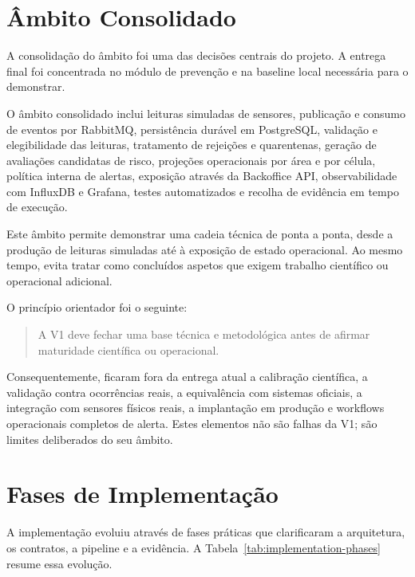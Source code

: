 \section{Âmbito Consolidado}

A consolidação do âmbito foi uma das decisões centrais do projeto. A entrega final foi concentrada no módulo de prevenção e na baseline local necessária para o demonstrar.

O âmbito consolidado inclui leituras simuladas de sensores, publicação e consumo de eventos por RabbitMQ, persistência durável em PostgreSQL, validação e elegibilidade das leituras, tratamento de rejeições e quarentenas, geração de avaliações candidatas de risco, projeções operacionais por área e por célula, política interna de alertas, exposição através da Backoffice API, observabilidade com InfluxDB e Grafana, testes automatizados e recolha de evidência em tempo de execução.

Este âmbito permite demonstrar uma cadeia técnica de ponta a ponta, desde a produção de leituras simuladas até à exposição de estado operacional. Ao mesmo tempo, evita tratar como concluídos aspetos que exigem trabalho científico ou operacional adicional.

O princípio orientador foi o seguinte:

\begin{quote}
A V1 deve fechar uma base técnica e metodológica antes de afirmar maturidade científica ou operacional.
\end{quote}

Consequentemente, ficaram fora da entrega atual a calibração científica, a validação contra ocorrências reais, a equivalência com sistemas oficiais, a integração com sensores físicos reais, a implantação em produção e workflows operacionais completos de alerta. Estes elementos não são falhas da V1; são limites deliberados do seu âmbito.

\section{Fases de Implementação}

A implementação evoluiu através de fases práticas que clarificaram a arquitetura, os contratos, a pipeline e a evidência. A Tabela~\ref{tab:implementation-phases} resume essa evolução.

